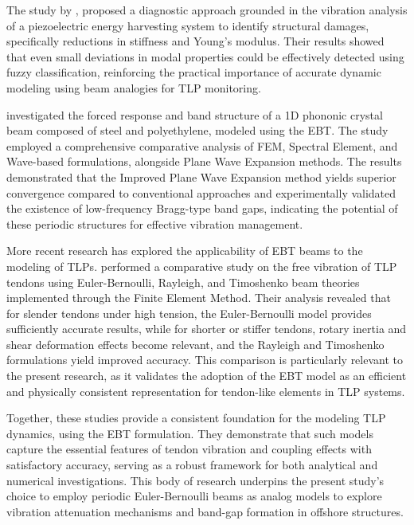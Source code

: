 The study by \textcite{Jahangiri2016}, proposed a diagnostic approach grounded in the vibration analysis of a piezoelectric energy harvesting system to identify structural damages, specifically reductions in stiffness and Young's modulus. Their results showed that even small deviations in modal properties could be effectively detected using fuzzy classification, reinforcing the practical importance of accurate dynamic modeling using beam analogies for TLP monitoring.

\textcite{MirandaJr2017} investigated the forced response and band structure of a 1D phononic crystal beam composed of steel and polyethylene, modeled using the EBT. The study employed a comprehensive comparative analysis of FEM, Spectral Element, and Wave-based formulations, alongside Plane Wave Expansion methods. The results demonstrated that the Improved Plane Wave Expansion method yields superior convergence compared to conventional approaches and experimentally validated the existence of low-frequency Bragg-type band gaps, indicating the potential of these periodic structures for effective vibration management.

More recent research has explored the applicability of EBT beams to the modeling of TLPs. \textcite{RamosJunior2022} performed a comparative study on the free vibration of TLP tendons using Euler-Bernoulli, Rayleigh, and Timoshenko beam theories implemented through the Finite Element Method. Their analysis revealed that for slender tendons under high tension, the Euler-Bernoulli model provides sufficiently accurate results, while for shorter or stiffer tendons, rotary inertia and shear deformation effects become relevant, and the Rayleigh and Timoshenko formulations yield improved accuracy. This comparison is particularly relevant to the present research, as it validates the adoption of the EBT model as an efficient and physically consistent representation for tendon-like elements in TLP systems.

Together, these studies provide a consistent foundation for the modeling TLP dynamics, using the EBT formulation. They demonstrate that such models capture the essential features of tendon vibration and coupling effects with satisfactory accuracy, serving as a robust framework for both analytical and numerical investigations. This body of research underpins the present study's choice to employ periodic Euler-Bernoulli beams as analog models to explore vibration attenuation mechanisms and band-gap formation in offshore structures.

